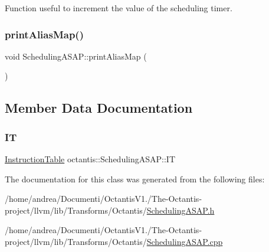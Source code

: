 Function useful to increment the value of the scheduling timer. 

\mbox{\label{classoctantis_1_1SchedulingASAP_ae3df036361ff37d74ca915487f1be0b4}} 
\subsubsection{\texorpdfstring{print\+Alias\+Map()}{printAliasMap()}}
{\footnotesize\ttfamily void Scheduling\+A\+S\+A\+P\+::print\+Alias\+Map (\begin{DoxyParamCaption}{ }\end{DoxyParamCaption})}



\subsection{Member Data Documentation}
\mbox{\label{classoctantis_1_1SchedulingASAP_ac53b361e1b4663c158238d93b931dce3}} 
\subsubsection{\texorpdfstring{IT}{IT}}
{\footnotesize\ttfamily \hyperlink{classoctantis_1_1InstructionTable}{Instruction\+Table} octantis\+::\+Scheduling\+A\+S\+A\+P\+::\+IT}



The documentation for this class was generated from the following files\+:\begin{DoxyCompactItemize}
\item 
/home/andrea/\+Documenti/\+Octantis\+V1./\+The-\/\+Octantis-\/project/llvm/lib/\+Transforms/\+Octantis/\hyperlink{SchedulingASAP_8h}{Scheduling\+A\+S\+A\+P.\+h}\item 
/home/andrea/\+Documenti/\+Octantis\+V1./\+The-\/\+Octantis-\/project/llvm/lib/\+Transforms/\+Octantis/\hyperlink{SchedulingASAP_8cpp}{Scheduling\+A\+S\+A\+P.\+cpp}\end{DoxyCompactItemize}
